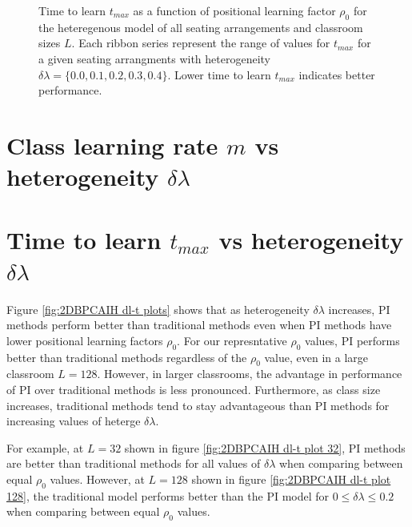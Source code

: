 \begin{figure}[htbp!]
   \caption{Time to learn $t_{max}$ as a function of positional learning factor $\rho_0$ for the heteregenous model of all seating arrangements and classroom sizes $L$. 
   Each ribbon series represent the range of values for $t_{max}$ for a given seating arrangments with heterogeneity $\delta\lambda = \lbrace 0.0, 0.1, 0.2, 0.3, 0.4 \rbrace$.
   Lower time to learn $t_{max}$ indicates better performance.
   }
   \label{fig:2DBPCAIH t-rho ribbon plot}
 \end{figure}

 \newpage %

\section{Class learning rate $m$ vs heterogeneity $\delta\lambda$}\label{sec:BPCAIH m vs dl}

\section{Time to learn $t_{max}$ vs heterogeneity $\delta\lambda$}\label{sec:BPCAIH t vs dl}

Figure \ref{fig:2DBPCAIH dl-t plots} shows that as heterogeneity $\delta\lambda$ increases, PI methods perform better than traditional methods even when PI methods have lower positional learning factors $\rho_0$. For our represntative $\rho_0$ values, PI performs better than traditional methods regardless of the $\rho_0$ value, even in a large classroom $L=128$. 
However, in larger classrooms, the advantage in performance of PI over traditional methods is less pronounced. 
Furthermore, as class size increases, traditional methods tend to stay advantageous than PI methods for increasing values of heterge $\delta\lambda$.

For example, at $L=32$ shown in figure \ref{fig:2DBPCAIH dl-t plot 32}, PI methods are better than traditional methods for all values of $\delta\lambda$ when comparing between equal $\rho_0$ values. 
However, at $L=128$ shown in figure \ref{fig:2DBPCAIH dl-t plot 128}, the traditional model performs better than the PI model for $0 \leq \delta\lambda \leq 0.2$ when comparing between equal $\rho_0$ values.

